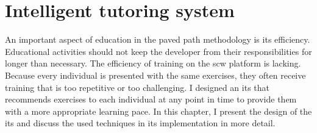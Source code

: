 \chapter{Intelligent tutoring system}
\label{ch:its-implementation}
An important aspect of education in the paved path methodology is its efficiency.
Educational activities should not keep the developer from their responsibilities for longer than necessary.
The efficiency of training on the \gls{scw} platform is lacking.
Because every individual is presented with the same exercises, they often receive training that is too repetitive or too challenging.
I designed an \gls{its} that recommends exercises to each individual at any point in time to provide them with a more appropriate learning pace.
In this chapter, I present the design of the \gls{its} and discuss the used techniques in its implementation in more detail.





